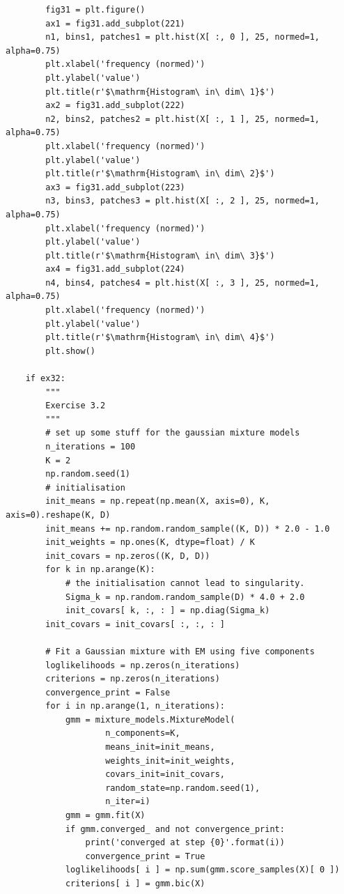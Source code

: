 \begin{verbatim}
        fig31 = plt.figure()
        ax1 = fig31.add_subplot(221)
        n1, bins1, patches1 = plt.hist(X[ :, 0 ], 25, normed=1, alpha=0.75)
        plt.xlabel('frequency (normed)')
        plt.ylabel('value')
        plt.title(r'$\mathrm{Histogram\ in\ dim\ 1}$')
        ax2 = fig31.add_subplot(222)
        n2, bins2, patches2 = plt.hist(X[ :, 1 ], 25, normed=1, alpha=0.75)
        plt.xlabel('frequency (normed)')
        plt.ylabel('value')
        plt.title(r'$\mathrm{Histogram\ in\ dim\ 2}$')
        ax3 = fig31.add_subplot(223)
        n3, bins3, patches3 = plt.hist(X[ :, 2 ], 25, normed=1, alpha=0.75)
        plt.xlabel('frequency (normed)')
        plt.ylabel('value')
        plt.title(r'$\mathrm{Histogram\ in\ dim\ 3}$')
        ax4 = fig31.add_subplot(224)
        n4, bins4, patches4 = plt.hist(X[ :, 3 ], 25, normed=1, alpha=0.75)
        plt.xlabel('frequency (normed)')
        plt.ylabel('value')
        plt.title(r'$\mathrm{Histogram\ in\ dim\ 4}$')
        plt.show()

    if ex32:
        """
        Exercise 3.2
        """
        # set up some stuff for the gaussian mixture models
        n_iterations = 100
        K = 2
        np.random.seed(1)
        # initialisation
        init_means = np.repeat(np.mean(X, axis=0), K, axis=0).reshape(K, D)
        init_means += np.random.random_sample((K, D)) * 2.0 - 1.0
        init_weights = np.ones(K, dtype=float) / K
        init_covars = np.zeros((K, D, D))
        for k in np.arange(K):
            # the initialisation cannot lead to singularity.
            Sigma_k = np.random.random_sample(D) * 4.0 + 2.0
            init_covars[ k, :, : ] = np.diag(Sigma_k)
        init_covars = init_covars[ :, :, : ]

        # Fit a Gaussian mixture with EM using five components
        loglikelihoods = np.zeros(n_iterations)
        criterions = np.zeros(n_iterations)
        convergence_print = False
        for i in np.arange(1, n_iterations):
            gmm = mixture_models.MixtureModel(
                    n_components=K,
                    means_init=init_means,
                    weights_init=init_weights,
                    covars_init=init_covars,
                    random_state=np.random.seed(1),
                    n_iter=i)
            gmm = gmm.fit(X)
            if gmm.converged_ and not convergence_print:
                print('converged at step {0}'.format(i))
                convergence_print = True
            loglikelihoods[ i ] = np.sum(gmm.score_samples(X)[ 0 ])
            criterions[ i ] = gmm.bic(X)


\end{verbatim}
